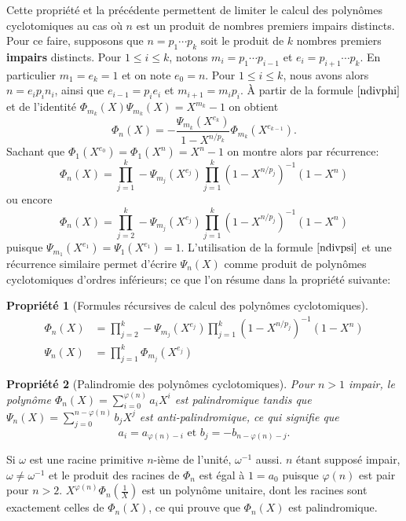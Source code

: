\documentclass{article}
\theoremstyle{break}                  %
\newtheorem{propriete}{Propriété}
\begin{document}
Cette propriété et la précédente permettent de limiter le calcul des polynômes cyclotomiques au cas où $n$ est un produit de nombres premiers impairs distincts.\\


Pour ce faire, supposons que $n = p_1 \cdots p_k$ soit le produit de $k$ nombres premiers \textbf{impairs} distincts. Pour $1 \le i \le k$, notons $m_i = p_1 \cdots p_{i-1}$ et $e_i = p_{i+1} \cdots p_{k}$. En particulier $m_1=e_k=1$ et on note $e_0 = n$. Pour $1 \le i \le k$, nous avons alors $n = e_i p_i n_i$, ainsi que $e_{i-1}=p_i e_i$ et $m_{i+1}=m_i p_i$. À partir de la formule $\ref{ndivphi}$ et de l'identité $\Phi_{m_k}(X) \Psi_{m_k}(X) = X^{m_k}-1$ on obtient
$$\Phi_{n}(X) = - \frac{\Psi_{m_k}(X^{e_k})}{1- X^{n/p_k}} \Phi_{m_k}(X^{e_{k-1}}).$$
Sachant que $\Phi_1(X^{e_0}) = \Phi_1(X^n) = X^n-1$ on montre alors par récurrence:
$$\Phi_n(X)=\prod_{j=1}^{k} - \Psi_{m_j}(X^{e_j}) \prod_{j=1}^{k} (1-X^{n/p_j})^{-1}(1-X^n)$$
ou encore $$\Phi_n(X)=\prod_{j=2}^{k} - \Psi_{m_j}(X^{e_j}) \prod_{j=1}^{k} (1-X^{n/p_j})^{-1}(1-X^n)$$
puisque $\Psi_{m_1}(X^{e_1}) = \Psi_{1}(X^{e_1}) =1$. L'utilisation de la formule $\ref{ndivpsi}$ et une récurrence similaire permet d'écrire $\Psi_n(X)$ comme produit de polynômes cyclotomiques d'ordres inférieurs; ce que l'on résume dans la propriété suivante:


\begin{propriete}[Formules récursives de calcul des polynômes cyclotomiques]
	\begin{align*}
		\Phi_n(X) &=\prod_{j=2}^{k} - \Psi_{m_j}(X^{e_j}) \prod_{j=1}^{k} (1-X^{n/p_j})^{-1}(1-X^n)\tag{3.17}\label{recurphi}\\
		\Psi_{n}(X) &=\prod_{j=1}^{k} \Phi_{m_j}(X^{e_j})\tag{3.25}\label{recurpsi}
	\end{align*}
\end{propriete}

\begin{propriete}[Palindromie des polynômes cyclotomiques]
	Pour $n > 1$ impair, le polynôme $\Phi_n(X) = \sum_{i=0}^{\varphi(n)} a_i X^i$ est palindromique tandis que $\Psi_n(X) = \sum_{j=0}^{n-\varphi(n)} b_j X^j$ est anti-palindromique, ce qui signifie que
	$$a_i=a_{\varphi(n)-i} \text{ et } b_j=-b_{n-\varphi(n)-j}.$$
\end{propriete}
Si $\omega$ est une racine primitive $n$-ième de l'unité, $\omega^{-1}$ aussi. $n$ étant supposé impair, $\omega \neq \omega^{-1}$ et le produit des racines de $\Phi_{n}$ est égal à $1 = a_0$ puisque $\varphi(n)$ est pair pour $n > 2$. $X^{\varphi(n)} \Phi_n(\frac{1}{X})$ est un polynôme unitaire, dont les racines sont exactement celles de $\Phi_n(X)$, ce qui prouve que $\Phi_n(X)$ est palindromique.\\
\end{document}
